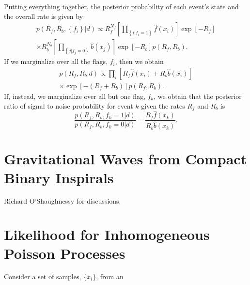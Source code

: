 \documentclass[aps,prd,reprint]{revtex4-1}
\begin{document}
Putting everything together, the posterior probability of each event's
state and the overall rate is given by
\begin{multline}
  p(R_f, R_b, \left\{ f_i \right\} | d) \propto R_f^{N_f}
  \left[ \prod_{\left\{ i | f_i = 1 \right\}}
    \hat{f}\left( x_i \right) \right] \exp\left[ - R_f \right] \\
  \times R_b^{N_b} \left[ \prod_{\left\{ j | f_j = 0 \right\}}
    \hat{b}\left( x_j \right) \right] \exp\left[ - R_b \right] p(R_f, R_b).
\end{multline}
If we marginalize over all the flags, $f_i$, then we obtain
\begin{multline}
  p(R_f, R_b | d) \propto \prod_{i} \left[ R_f \hat{f}\left( x_i
    \right) + R_b \hat{b}\left( x_i \right) \right] \\ \times
  \exp\left[ - \left( R_f + R_b \right) \right] p\left( R_f, R_b
  \right).
\end{multline}
If, instead, we marginalize over all but one flag, $f_k$, we obtain
that the posterior ratio of signal to noise probability for event $k$
given the rates $R_f$ and $R_b$ is 
\begin{equation}
  \frac{p(R_f, R_b, f_k = 1 | d)}{p(R_f, R_b, f_k = 0 | d)} =
  \frac{R_f \hat{f}\left( x_k \right)}{R_b \hat{b}\left( x_k \right)}. 
\end{equation}


\section{Gravitational Waves from Compact Binary Inspirals}
\label{sec:GW-example}

\begin{acknowledgments}
  Richard O'Shaughnessy for discussions.
\end{acknowledgments}

\appendix

\section{Likelihood for Inhomogeneous Poisson Processes}
\label{sec:likelihood-derivation}

Consider a set of samples, $\{ x_i \}$, from an 



\end{document}
